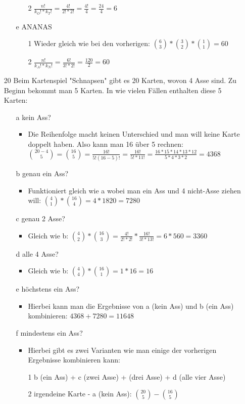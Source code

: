\documentclass{article}
\begin{document}
\begin{itemize}
\begin{itemize}
\begin{itemize}
				\item[2]{$\frac{n!}{k_O!*k_T!}=\frac{4!}{2!*2!}=\frac{4!}{4}=\frac{24}{4}=6$}
			\end{itemize}
			\item[e]{ANANAS}
			\begin{itemize}
				\item[1]{Wieder gleich wie bei den vorherigen: $\binom{6}{3}*\binom{3}{2}*\binom{1}{1}=60$}
				\item[2]{$\frac{n!}{k_A!*k_N!}=\frac{6!}{3!*2!}=\frac{120}{2}=60$}
			\end{itemize}
		\end{itemize}
		\item[20]{Beim Kartenspiel "Schnapsen" gibt es 20 Karten, wovon 4 Asse sind. Zu Beginn bekommt man 5 Karten. In wie vielen Fällen enthalten diese 5 Karten:}
		\begin{itemize}
			\item[a]{kein Ass?}
			\begin{itemize}
				\item{Die Reihenfolge macht keinen Unterschied und man will keine Karte doppelt haben. Also kann man 16 über 5 rechnen: $\binom{20-4}{5}=\binom{16}{5}=\frac{16!}{5!(16-5)!}=\frac{16!}{5!*11!}=\frac{16*15*14*13*12}{5*4*3*2}=4368$}
			\end{itemize}
			\item[b]{genau ein Ass?}
			\begin{itemize}
				\item{Funktioniert gleich wie a wobei man ein Ass und 4 nicht-Asse ziehen will: $\binom{4}{1}*\binom{16}{4}=4*1820=7280$}
			\end{itemize}
			\item[c]{genau 2 Asse?}
			\begin{itemize}
				\item{Gleich wie b: $\binom{4}{2}*\binom{16}{3}=\frac{4!}{2!*2!}*\frac{16!}{3!*13!}=6*560=3360$}
			\end{itemize}
			\item[d]{alle 4 Asse?}
			\begin{itemize}
				\item{Gleich wie b: $\binom{4}{4}*\binom{16}{1}=1*16=16$}
			\end{itemize}
			\item[e]{höchstens ein Ass?}
			\begin{itemize}
				\item{Hierbei kann man die Ergebnisse von a (kein Ass) und b (ein Ass) kombinieren: $4368+7280=11648$}
			\end{itemize}
			\item[f]{mindestens ein Ass?}
			\begin{itemize}
				\item{Hierbei gibt es zwei Varianten wie man einige der vorherigen Ergebnisse kombinieren kann:}
				\item[1]{b (ein Ass) + c (zwei Asse) + (drei Asse) + d (alle vier Asse)}
				\item[2]{irgendeine Karte - a (kein Ass): $\binom{20}{5} - \binom{16}{5}$}
			\end{itemize}
		\end{itemize}
	\end{itemize}
\end{document}
